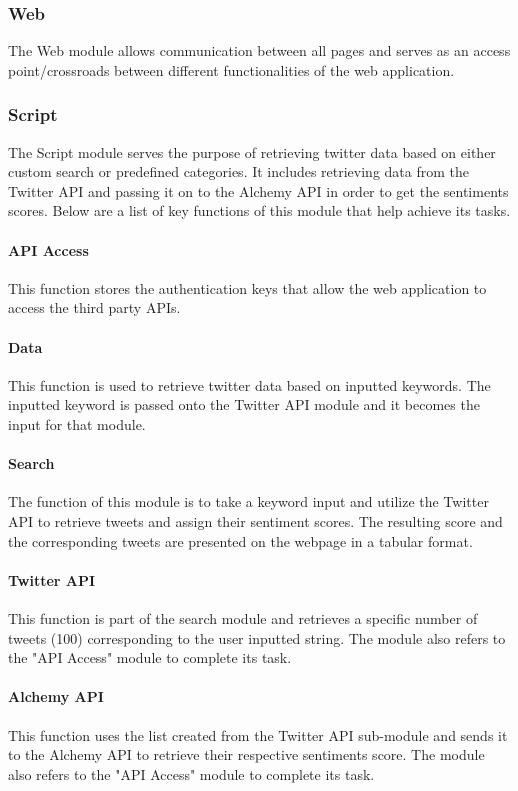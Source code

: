 \documentclass[12pt, titlepage]{article}
\begin{document}
\subsubsection{Web}
The Web module allows communication between all pages and serves as an access point/crossroads between different functionalities of the web application.

\subsubsection{Script}

The Script module serves the purpose of retrieving twitter data based on either custom search or predefined categories.  It includes retrieving data from the Twitter API and passing it on to the Alchemy API in order to get the sentiments scores. Below are a list of key functions of this module that help achieve its tasks. 

\paragraph{API Access}
This function stores the authentication keys that allow the web application to access the third party APIs.

\paragraph{Data}
This function is used to retrieve twitter data based on inputted keywords. The inputted keyword is passed onto the Twitter API module and it becomes the input for that module.

\paragraph{Search}
The function of this module is to take a keyword input and utilize the Twitter API to retrieve tweets and assign their sentiment scores. The resulting score and the corresponding tweets are presented on the webpage in a tabular format. 

\paragraph{Twitter API}
This function is part of the search module and retrieves a specific number of tweets (100) corresponding to the user inputted string. The module also refers to the "API Access" module to complete its task.

\paragraph{Alchemy API}
This function uses the list created from the Twitter API sub-module and sends it to the Alchemy API to retrieve their respective sentiments score.  The module also refers to the "API Access" module to complete its task.
\end{document}
